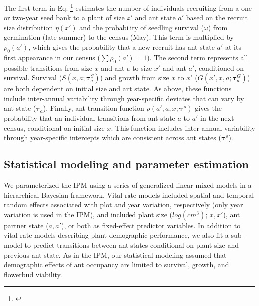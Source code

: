 \documentclass[11pt]{article}
\newcommand{\tom}[2]{{\color{red}{#1}}\footnote{\textit{\color{red}{#2}}}}
\begin{document}
\noindent The first term in Eq. \tom{\ref{eqn:IPM2}}{We should label equations. I am not sure why the equation label is not working here and I did not try to figure it out. It is probably something with the linenomath formatting.} estimates the number of individuals recruiting from a one or two-year seed bank to a plant of size $x'$ and ant state $a'$ based on the recruit size distribution $\eta(x')$ and the probability of seedling survival ($\omega$) from germination (late summer) to the census (May).
This term is multiplied by $\rho_{0}(a')$, which gives the probability that a new recruit has ant state $a'$ at its first appearance in our census ($\sum\rho_{0}(a')=1$). 
The second term represents all possible transitions from size $x$ and ant $a$ to size $x'$ and ant $a'$, conditioned on survival. 
Survival ($S(x,a;\pmb{\tau}^S_{a})$) and growth from size $x$ to $x'$ ($G(x',x,a;\pmb{\tau}^G_{a})$) are both dependent on initial size and ant state. 
As above, these functions include inter-annual variability through year-specific deviates that can vary by ant state ($\pmb{\tau}_{a}$). 
Finally, ant transition function $\rho(a',a,x;\pmb{\tau}^{\rho})$ gives the probability that an individual transitions from ant state $a$ to $a'$ in the next census, conditional on initial size $x$. 
This function includes inter-annual variability through year-specific intercepts which are consistent across ant states ($\pmb{\tau}^\rho$).

\subsection*{Statistical modeling and parameter estimation}
We parameterized the IPM using a series of generalized linear mixed models in a hierarchical Bayesian framework. 
Vital rate models included spatial and temporal random effects associated with plot and year variation, respectively (only year variation is used in the IPM), and included plant size ($log(cm^3)$; $x,x'$), ant partner state ($a,a'$), or both as fixed-effect predictor variables. 
In addition to vital rate models describing plant demographic performance, we also fit a sub-model to predict transitions between ant states conditional on plant size and previous ant state. 
As in the IPM, our statistical modeling assumed that demographic effects of ant occupancy are limited to survival, growth, and flowerbud viability. 

\end{document}
